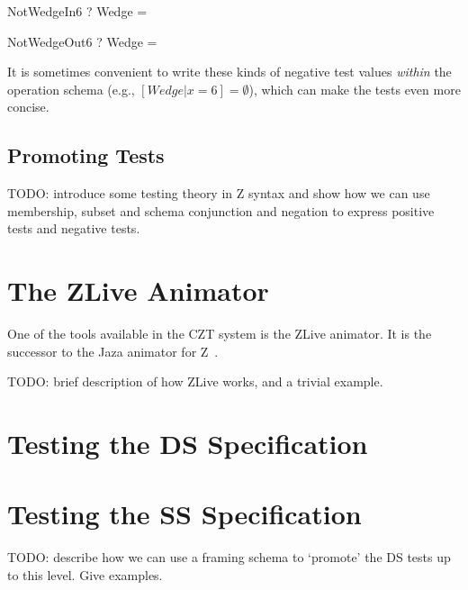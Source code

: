 \documentclass{llncs}
\begin{document}
\begin{theorem}{NotWedgeIn6}
\vdash? \quad [State | x=6] \land Wedge = \emptyset
\end{theorem}

\begin{theorem}{NotWedgeOut6}
\vdash? \quad [State' | x'=6] \land Wedge = \emptyset
\end{theorem}

It is sometimes convenient to write these kinds of negative test values
\emph{within} the operation schema (e.g., $[Wedge | x=6] = \emptyset$),
which can make the tests even more concise.


\subsection{Promoting Tests}

TODO: introduce some testing theory in Z syntax and show how we can
use membership, subset and schema conjunction and negation to 
express positive tests and negative tests.


\section{The ZLive Animator}

One of the tools available in the CZT system is the ZLive animator.
It is the successor to the Jaza animator for Z~\cite{utting:jaza}.

TODO: brief description of how ZLive works, and a trivial example.


\section{Testing the DS Specification}




\section{Testing the SS Specification}

TODO: describe how we can use a framing schema to `promote' the DS tests
up to this level.  Give examples.
\end{document}
